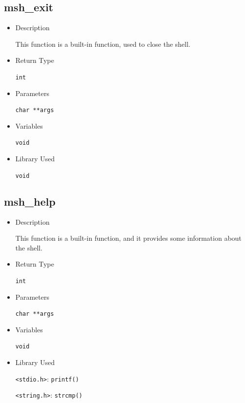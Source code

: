 \documentclass{article}
\begin{document}
\subsection{msh\_exit}
\begin{itemize}
\item Description

This function is a built-in function, used to close the shell.

\item Return Type

\verb|int|

\item Parameters

\verb|char **args|

\item Variables

\verb|void|

\item Library Used

\verb|void|
\end{itemize}

\subsection{msh\_help}
\begin{itemize}
\item Description

This function is a built-in function, and it provides some information about the shell.

\item Return Type

\verb|int|

\item Parameters

\verb|char **args|

\item Variables

\verb|void|

\item Library Used

\verb|<stdio.h>|: \verb|printf()|

\verb|<string.h>|: \verb|strcmp()|
\end{itemize}
\end{document}
